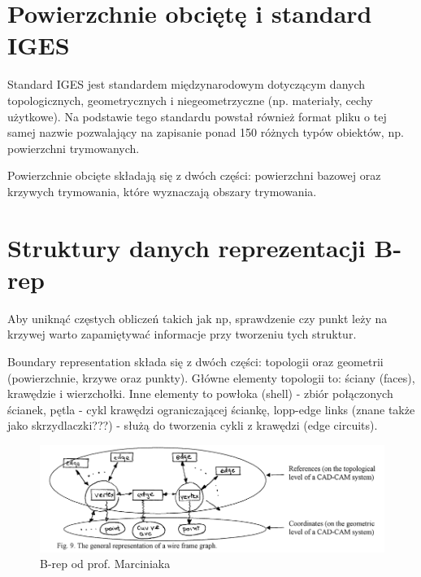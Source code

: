 \documentclass[12pt]{article}
\begin{document}
\section{Powierzchnie obciętę i standard IGES}
Standard IGES jest standardem międzynarodowym dotyczącym danych topologicznych, geometrycznych i niegeometrzyczne (np. materiały, cechy użytkowe). Na podstawie tego standardu powstał również format pliku o tej samej nazwie pozwalający na zapisanie ponad 150 różnych typów obiektów, np. powierzchni trymowanych.

Powierzchnie obcięte składają się z dwóch części: powierzchni bazowej oraz krzywych trymowania, które wyznaczają obszary trymowania.

\section{Struktury danych reprezentacji B-rep}
Aby uniknąć częstych obliczeń takich jak np, sprawdzenie czy punkt leży na krzywej warto zapamiętywać informacje przy tworzeniu tych struktur.


Boundary representation składa się z dwóch części: topologii oraz geometrii (powierzchnie, krzywe oraz punkty). Główne elementy topologii to: ściany (faces), krawędzie i wierzchołki. Inne elementy to powłoka (shell) - zbiór połączonych ścianek, pętla - cykl krawędzi ograniczającej ściankę, lopp-edge links (znane także jako skrzydlaczki???) - służą do tworzenia cykli z krawędzi (edge circuits). 

\begin{figure}[H]
	\centering
	\includegraphics[scale=0.5]{Pictures/brep}
	\caption{B-rep od prof. Marciniaka}
\end{figure}
\end{document}
